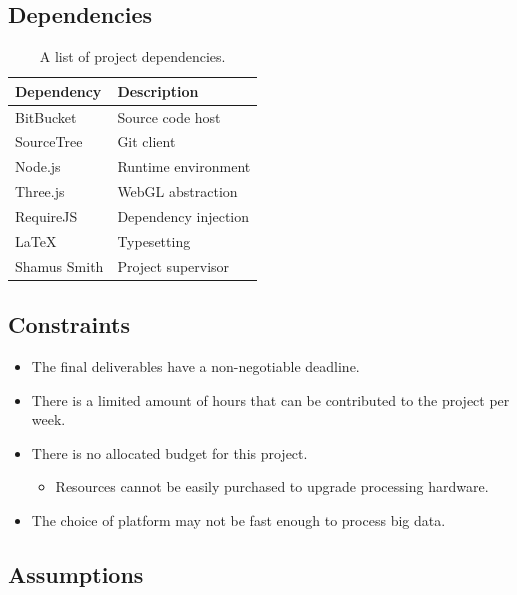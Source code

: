 \documentclass[
	fontsize=11pt
	headlines=2,
	footlines=2,
	parskip=half
]{scrartcl}
\begin{document}
{{{			}
		
		}
		
		\subsection{Dependencies} {
		\label{sec:dependencies}
		
			\begin{table}[H]
			\caption{A list of project dependencies.}
			\begin{tabularx}{\textwidth}{@{}XX@{}}
				\toprule
				\textbf{Dependency} & \textbf{Description} \\
				\midrule
				BitBucket & Source code host \\
				SourceTree & Git client \\
				Node.js & Runtime environment \\
				Three.js & WebGL abstraction \\
				RequireJS & Dependency injection \\
				LaTeX & Typesetting \\
				Shamus Smith & Project supervisor \\
				\bottomrule
			\end{tabularx}
			\end{table}
		
		}
		
		\subsection{Constraints} {
		\label{sec:constraints}
			
			\begin{itemize}
				\item The final deliverables have a non-negotiable deadline.
				\item There is a limited amount of hours that can be contributed to the project per week.
				\item There is no allocated budget for this project.
				\begin{itemize}
					\item Resources cannot be easily purchased to upgrade processing hardware.
				\end{itemize}
				\item The choice of platform may not be fast enough to process big data.
			\end{itemize}
		
		}
		
		\subsection{Assumptions} {
		\label{sec:assumptions}
			
}}
\end{document}
